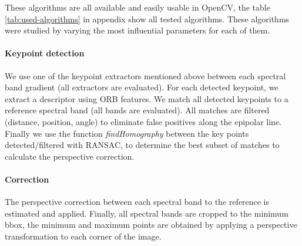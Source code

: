 \documentclass[]{elsarticle}
\begin{document}
	These algorithms are all available and easily usable in OpenCV, the table \ref{tab:used-algorithms} in appendix
	show all tested algorithms. These algorithms were studied by varying the most influential parameters for each of them.
	
	\paragraph{Keypoint detection}
	We use one of the keypoint extractors mentioned above between each spectral band gradient (all extractors are evaluated).
	For each detected keypoint, we extract a descriptor using ORB features.
	We match all detected keypoints to a reference spectral band (all bands are evaluated).
	All matches are filtered (distance, position, angle) to eliminate false positives along the epipolar line.
	Finally we use the function \textit{findHomography} between the key points detected/filtered with RANSAC,
	to determine the best subset of matches to calculate the perspective correction.
	
	
	\paragraph{Correction}
	
	The perspective correction between each spectral band to the reference is estimated and applied.
	Finally, all spectral bands are cropped to the minimum bbox,
	the minimum and maximum points are obtained by applying a perspective transformation to each corner of the image.
	
	
\end{document}
